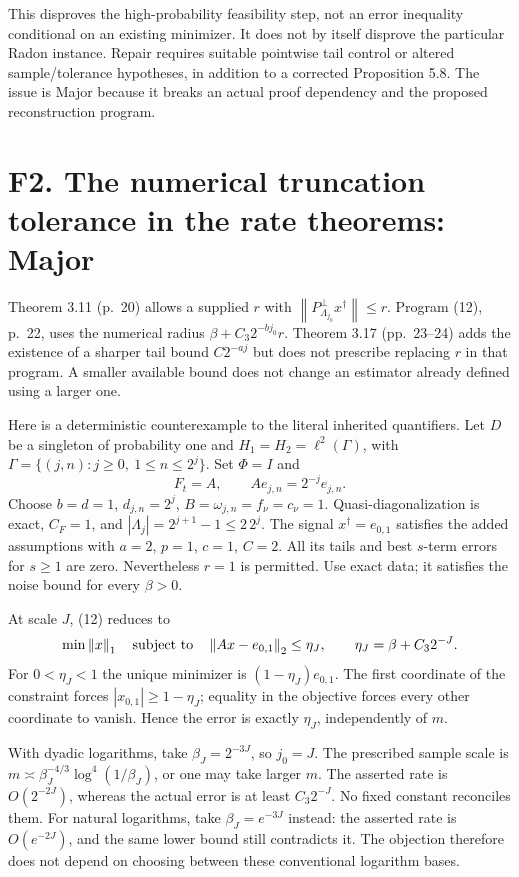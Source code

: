 \documentclass[10pt]{article}
\begin{document}
This disproves the high-probability feasibility step, not an error inequality conditional on an existing minimizer. It does not by itself disprove the particular Radon instance. Repair requires suitable pointwise tail control or altered sample/tolerance hypotheses, in addition to a corrected Proposition 5.8. The issue is Major because it breaks an actual proof dependency and the proposed reconstruction program.\par
\section*{F2. The numerical truncation tolerance in the rate theorems: Major}
Theorem 3.11 (p. 20) allows a supplied \(r\) with \(\left\lVert P_{\Lambda_{j_0}}^\perp x^\dagger\right\rVert\le r\). Program (12), p. 22, uses the numerical radius \(\beta+C_3 2^{-bj_0}r\). Theorem 3.17 (pp. 23–24) adds the existence of a sharper tail bound \(C2^{-aj}\) but does not prescribe replacing \(r\) in that program. A smaller available bound does not change an estimator already defined using a larger one.\par
Here is a deterministic counterexample to the literal inherited quantifiers. Let \(D\) be a singleton of probability one and \(H_1=H_2=\ell^2(\Gamma)\), with \(\Gamma=\{(j,n):j\ge0,\ 1\le n\le2^j\}\). Set \(\Phi=I\) and \[F_t=A,\qquad Ae_{j,n}=2^{-j}e_{j,n}.\] Choose \(b=d=1\), \(d_{j,n}=2^j\), \(B=\omega_{j,n}=f_\nu=c_\nu=1\). Quasi-diagonalization is exact, \(C_F=1\), and \(|\Lambda_j|=2^{j+1}-1\le2\,2^j\). The signal \(x^\dagger=e_{0,1}\) satisfies the added assumptions with \(a=2\), \(p=1\), \(c=1\), \(C=2\). All its tails and best \(s\)-term errors for \(s\ge1\) are zero. Nevertheless \(r=1\) is permitted. Use exact data; it satisfies the noise bound for every \(\beta>0\).\par
At scale \(J\), (12) reduces to \[\min\left\lVert x\right\rVert_1\quad\hbox{subject to}\quad
\left\lVert Ax-e_{0,1}\right\rVert_2\le\eta_J,\qquad
\eta_J=\beta+C_3 2^{-J}.\] For \(0<\eta_J<1\) the unique minimizer is \((1-\eta_J)e_{0,1}\). The first coordinate of the constraint forces \(|x_{0,1}|\ge1-\eta_J\); equality in the objective forces every other coordinate to vanish. Hence the error is exactly \(\eta_J\), independently of \(m\).\par
With dyadic logarithms, take \(\beta_J=2^{-3J}\), so \(j_0=J\). The prescribed sample scale is \(m\asymp\beta_J^{-4/3}\log^4(1/\beta_J)\), or one may take larger \(m\). The asserted rate is \(O(2^{-2J})\), whereas the actual error is at least \(C_3 2^{-J}\). No fixed constant reconciles them. For natural logarithms, take \(\beta_J=e^{-3J}\) instead: the asserted rate is \(O(e^{-2J})\), and the same lower bound still contradicts it. The objection therefore does not depend on choosing between these conventional logarithm bases.\par
\end{document}
